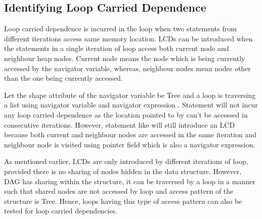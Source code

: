 \subsection{Identifying Loop Carried Dependence}
Loop carried dependence is incurred in the loop when two statements from different 
iterations access same memory location. LCDs can be introduced 
when the statements in a single iteration of loop access both current node and neighbour heap nodes.  
Current node means the node which is being currently accessed by the navigator 
variable, whereas, neighbour nodes mean nodes other than the one being currently 
accessed. 
\begin{example}{\rm
Let the shape attribute of the navigator variable  be Tree and 
a loop is traversing a list using navigator variable  and navigator expression . 
Statement  will not incur any loop carried dependence as 
the location pointed to by  can't be accessed in consecutive iterations. 
However, statement like  
will still introduce an LCD because both current and neighbour nodes are accessed 
in the same iteration and neighbour node is visited using pointer field  
which is also a navigator expression. 
}
\hfill\psframebox{}  \end{example}
As mentioned earlier, LCDs are only introduced by different iterations of loop, provided there is 
no sharing of nodes hidden in the data structure. However, DAG has sharing within the 
structure, it can be traversed by a loop in a manner such that shared nodes 
are not accessed by loop and access pattern of the structure is Tree. Hence, loops having this type 
of access pattern can also be tested for loop carried dependencies. 

